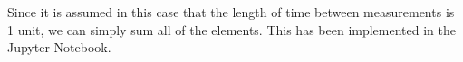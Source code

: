 Since it is assumed in this case that the length of time between measurements is 1 unit, we can simply sum all of the elements. This has been implemented in the Jupyter Notebook.